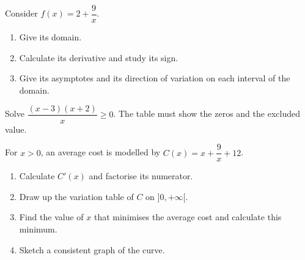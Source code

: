 \begin{exercice}
Consider $f(x)=2+\dfrac{9}x$.
\begin{enumerate}
\item Give its domain.
\item Calculate its derivative and study its sign.
\item Give its asymptotes and its direction of variation on each interval of the domain.
\end{enumerate}
\end{exercice}
\begin{exercice}
Solve $\dfrac{(x-3)(x+2)}x\geq0$. The table must show the zeros and the excluded value.
\end{exercice}
\begin{exercice}
For $x>0$, an average cost is modelled by $C(x)=x+\dfrac{9}x+12$.
\begin{enumerate}
\item Calculate $C'(x)$ and factorise its numerator.
\item Draw up the variation table of $C$ on $]0,+\infty[$.
\item Find the value of $x$ that minimises the average cost and calculate this minimum.
\item Sketch a consistent graph of the curve.
\end{enumerate}
\end{exercice}

